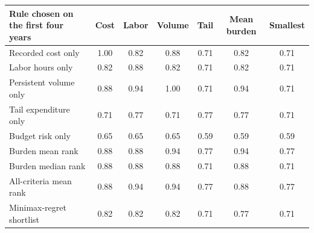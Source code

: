 \begin{tabular}{p{4.0cm}cccccc}
\toprule
Rule chosen on the first four years & Cost & Labor & Volume & Tail & Mean burden & Smallest \\
\midrule
Recorded cost only & 1.00 & 0.82 & 0.88 & 0.71 & 0.82 & 0.71 \\
Labor hours only & 0.82 & 0.88 & 0.82 & 0.71 & 0.82 & 0.71 \\
Persistent volume only & 0.88 & 0.94 & 1.00 & 0.71 & 0.94 & 0.71 \\
Tail expenditure only & 0.71 & 0.77 & 0.71 & 0.77 & 0.77 & 0.71 \\
Budget risk only & 0.65 & 0.65 & 0.65 & 0.59 & 0.59 & 0.59 \\
Burden mean rank & 0.88 & 0.88 & 0.94 & 0.77 & 0.94 & 0.77 \\
Burden median rank & 0.88 & 0.88 & 0.88 & 0.71 & 0.88 & 0.71 \\
All-criteria mean rank & 0.88 & 0.94 & 0.94 & 0.77 & 0.88 & 0.77 \\
Minimax-regret shortlist & 0.82 & 0.82 & 0.82 & 0.71 & 0.77 & 0.71 \\
\bottomrule
\end{tabular}

